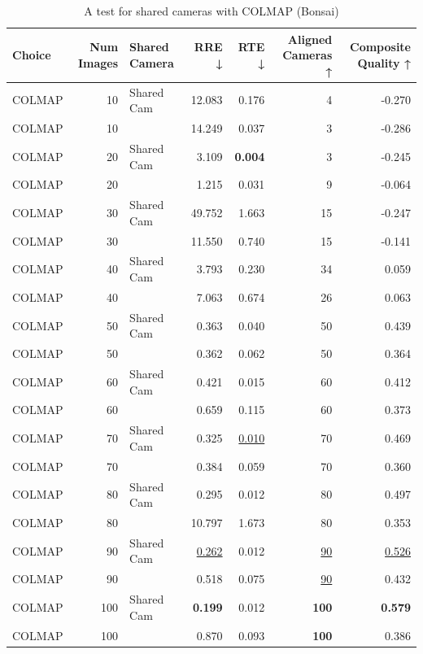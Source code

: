\begin{table}[H]
\caption{A test for shared cameras with COLMAP (Bonsai)}
\label{tab:06_shared_camera_colmap_bonsai}
\begin{tabular}{lrlrrrr}
\toprule
Choice & Num Images & Shared Camera & RRE ↓ & RTE ↓ & Aligned Cameras ↑ & Composite Quality ↑ \\
\midrule
COLMAP & 10 & Shared Cam & 12.083 & 0.176 & 4 & -0.270 \\
COLMAP & 10 &  & 14.249 & 0.037 & 3 & -0.286 \\
COLMAP & 20 & Shared Cam & 3.109 & \textbf{0.004} & 3 & -0.245 \\
COLMAP & 20 &  & 1.215 & 0.031 & 9 & -0.064 \\
COLMAP & 30 & Shared Cam & 49.752 & 1.663 & 15 & -0.247 \\
COLMAP & 30 &  & 11.550 & 0.740 & 15 & -0.141 \\
COLMAP & 40 & Shared Cam & 3.793 & 0.230 & 34 & 0.059 \\
COLMAP & 40 &  & 7.063 & 0.674 & 26 & 0.063 \\
COLMAP & 50 & Shared Cam & 0.363 & 0.040 & 50 & 0.439 \\
COLMAP & 50 &  & 0.362 & 0.062 & 50 & 0.364 \\
COLMAP & 60 & Shared Cam & 0.421 & 0.015 & 60 & 0.412 \\
COLMAP & 60 &  & 0.659 & 0.115 & 60 & 0.373 \\
COLMAP & 70 & Shared Cam & 0.325 & \underline{0.010} & 70 & 0.469 \\
COLMAP & 70 &  & 0.384 & 0.059 & 70 & 0.360 \\
COLMAP & 80 & Shared Cam & 0.295 & 0.012 & 80 & 0.497 \\
COLMAP & 80 &  & 10.797 & 1.673 & 80 & 0.353 \\
COLMAP & 90 & Shared Cam & \underline{0.262} & 0.012 & \underline{90} & \underline{0.526} \\
COLMAP & 90 &  & 0.518 & 0.075 & \underline{90} & 0.432 \\
COLMAP & 100 & Shared Cam & \textbf{0.199} & 0.012 & \textbf{100} & \textbf{0.579} \\
COLMAP & 100 &  & 0.870 & 0.093 & \textbf{100} & 0.386 \\
\bottomrule
\end{tabular}
\end{table}
